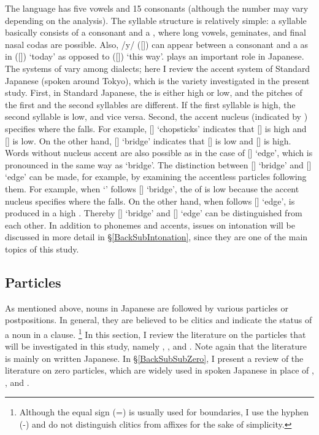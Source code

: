 The language has five vowels and 15 consonants (although the number may vary depending on the analysis).
The syllable structure is relatively simple:
a syllable basically consists of a consonant and a ,
where long vowels, geminates, and final nasal codas are possible.
Also, /y/ ([]) can appear between a consonant and a 
as in  ([]) `today' as opposed to  ([]) `this way'.
 plays an important role in Japanese.
The systems of  vary among dialects; here I review the accent system of Standard Japanese (spoken around Tokyo),
which is the variety investigated in the present study.
First, in Standard Japanese,
the  is either high or low, and
the pitches of the first and the second syllables are different.
If the first syllable is high, the second syllable is low,
and vice versa.
Second, the accent nucleus (indicated by {\tcorner}) specifies where the  falls.
For example,
[] `chopsticks' indicates that [] is high and [] is low.
On the other hand, [] `bridge' indicates that
[] is low and [] is high.
Words without nucleus accent are also possible as in the case of [] `edge',
which is pronounced in the same way as `bridge'.
The distinction between [] `bridge' and [] `edge' can be made, for example, by examining the accentless particles following them.
For example, when  `' follows [] `bridge', the  of  is low
because the accent nucleus specifies where the  falls.
On the other hand, when  follows [] `edge',  is produced in a high .
Thereby [] `bridge' and [] `edge' can be distinguished from each other.
In addition to phonemes and  accents, issues on intonation will be discussed in more detail in \S \ref{BackSubIntonation}, since they are one of the main topics of this study.


\subsection{Particles}\label{BackSubSecParticles}

As mentioned above,
nouns in Japanese are followed by various particles or postpositions.
In general, they are believed to be clitics and indicate the status of a noun in a clause.%
 \footnote{
 Although the equal sign (=) is usually used for  boundaries,
 I use the hyphen (-) and do not distinguish clitics from affixes for the sake of simplicity.
 }
In this section, I review the literature on the particles that will be investigated in this study, namely , , and . Note again that the literature is mainly on written Japanese.
In \S \ref{BackSubSubZero},
I present a review of the literature on zero particles,
which are widely used in spoken Japanese in place of , , and .

